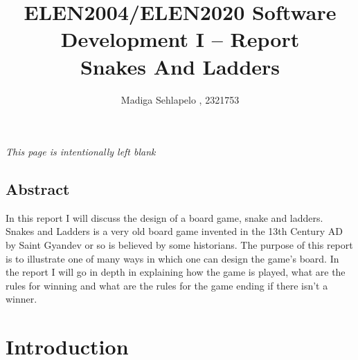 

\title{ELEN2004/ELEN2020 Software Development I -- Report \\ Snakes And Ladders}

\author{Madiga Sehlapelo , 2321753}
\maketitle 
\pagestyle{fancy}
\fancyhf{}
\fancyhead[R]{\thepage}
\newpage
\tableofcontents
\newpage
 
\begin{center}
	\textit{This page is intentionally left blank}
\end{center}
\newpage



\vspace*{\fill}
\begin{center}
	\begin{minipage}{.8\textwidth}
		\section*{Abstract}
		In this report I will discuss the design of a board game, snake and ladders. Snakes and Ladders is a very old board game invented in the 13th Century AD  by Saint Gyandev or so is believed by some historians. The purpose of this report is to illustrate one of many ways in which one can design the game's board. In the report I will go in depth in explaining how the game is played, what are the rules for winning and what are the rules for the game ending if there isn't a winner.
	\end{minipage}
\end{center}
\vfill %

\newpage
\section*{Introduction}
